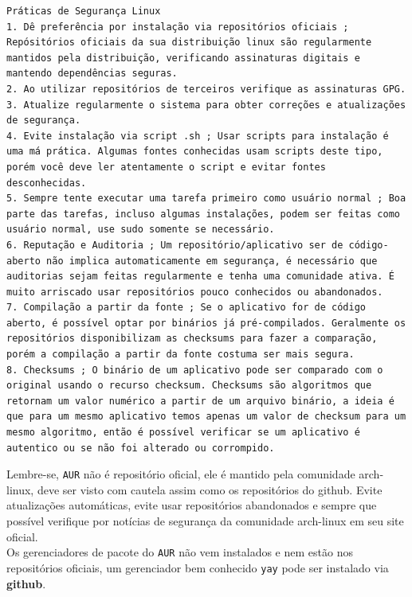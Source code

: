 \documentclass[12pt,a4paper]{article}
\begin{document}
\begin{lstlisting}
Práticas de Segurança Linux 
1. Dê preferência por instalação via repositórios oficiais ; Repósitórios oficiais da sua distribuição linux são regularmente mantidos pela distribuição, verificando assinaturas digitais e mantendo dependências seguras.
2. Ao utilizar repositórios de terceiros verifique as assinaturas GPG.
3. Atualize regularmente o sistema para obter correções e atualizações de segurança.
4. Evite instalação via script .sh ; Usar scripts para instalação é uma má prática. Algumas fontes conhecidas usam scripts deste tipo, porém você deve ler atentamente o script e evitar fontes desconhecidas. 
5. Sempre tente executar uma tarefa primeiro como usuário normal ; Boa parte das tarefas, incluso algumas instalações, podem ser feitas como usuário normal, use sudo somente se necessário.
6. Reputação e Auditoria ; Um repositório/aplicativo ser de código-aberto não implica automaticamente em segurança, é necessário que auditorias sejam feitas regularmente e tenha uma comunidade ativa. É muito arriscado usar repositórios pouco conhecidos ou abandonados. 
7. Compilação a partir da fonte ; Se o aplicativo for de código aberto, é possível optar por binários já pré-compilados. Geralmente os repositórios disponibilizam as checksums para fazer a comparação, porém a compilação a partir da fonte costuma ser mais segura. 
8. Checksums ; O binário de um aplicativo pode ser comparado com o original usando o recurso checksum. Checksums são algoritmos que retornam um valor numérico a partir de um arquivo binário, a ideia é que para um mesmo aplicativo temos apenas um valor de checksum para um mesmo algoritmo, então é possível verificar se um aplicativo é autentico ou se não foi alterado ou corrompido. 
\end{lstlisting}

\vspace{\baselineskip}

Lembre-se, \texttt{AUR} não é repositório oficial, ele é mantido pela comunidade arch-linux, deve ser visto com cautela assim como os repositórios do github. Evite atualizações automáticas, evite usar repositórios abandonados e sempre que possível verifique por notícias de segurança da comunidade arch-linux em seu site oficial. \\

Os gerenciadores de pacote do \texttt{AUR} não vem instalados e nem estão nos repositórios oficiais, um gerenciador bem conhecido \texttt{yay} pode ser instalado via \textbf{github}.
\end{document}
